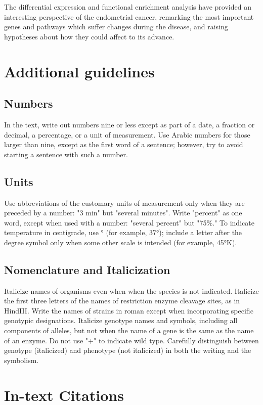 \documentclass[9pt,twocolumn,twoside]{gsajnl}
\begin{document}
The differential expression and functional enrichment analysis have provided an interesting perspective of the endometrial cancer, remarking the most important genes and pathways which suffer changes during the disease, and raising hypotheses about how they could affect to its advance. 

\section*{Additional guidelines}

\subsection*{Numbers} In the text, write out numbers nine or less except as part of a date, a fraction or decimal, a percentage, or a unit of measurement. Use Arabic numbers for those larger than nine, except as the first word of a sentence; however, try to avoid starting a sentence with such a number.

\subsection*{Units} Use abbreviations of the customary units of measurement only when they are preceded by a number: "3 min" but "several minutes". Write "percent" as one word, except when used with a number: "several percent" but "75\%." To indicate temperature in centigrade, use ° (for example, 37°); include a letter after the degree symbol only when some other scale is intended (for example, 45°K).

\subsection*{Nomenclature and Italicization} Italicize names of organisms even when  when the species is not indicated.  Italicize the first three letters of the names of restriction enzyme cleavage sites, as in HindIII. Write the names of strains in roman except when incorporating specific genotypic designations. Italicize genotype names and symbols, including all components of alleles, but not when the name of a gene is the same as the name of an enzyme. Do not use "+" to indicate wild type. Carefully distinguish between genotype (italicized) and phenotype (not italicized) in both the writing and the symbolism.

\section*{In-text Citations}
\end{document}
